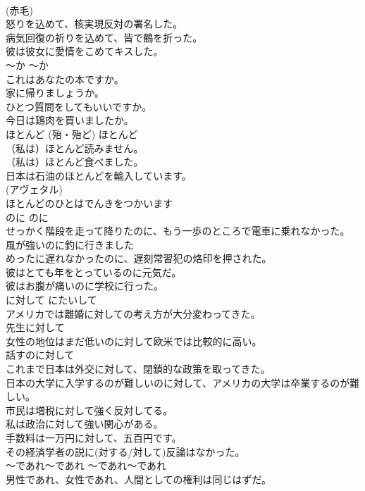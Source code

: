 \documentclass[8pt]{extreport}
\begin{document}
\begin{CJK}{UTF8}{min}
\\	(赤毛)
\\	怒りを込めて、核実現反対の署名した。  
\\	病気回復の祈りを込めて、皆で鶴を折った。  
\\	彼は彼女に愛情をこめてキスした。  
\\	〜か	〜か	
\\	これはあなたの本ですか。  
\\	家に帰りましょうか。  
\\	ひとつ質問をしてもいいですか。  
\\	今日は鶏肉を買いましたか。  
\\	ほとんど (殆・殆ど)	ほとんど	
\\	（私は）ほとんど読みません。  
\\	（私は）ほとんど食べました。  
\\	日本は石油のほとんどを輸入しています。  
\\	(アヴェタル)
\\	ほとんどのひとはでんきをつかいます  
\\	のに	のに	
\\	せっかく階段を走って降りたのに、もう一歩のところで電車に乗れなかった。  
\\	風が強いのに釣に行きました  
\\	めったに遅れなかったのに、遅刻常習犯の烙印を押された。  
\\	彼はとても年をとっているのに元気だ。   
\\	彼はお腹が痛いのに学校に行った。   
\\	に対して	にたいして	
\\	アメリカでは離婚に対しての考え方が大分変わってきた。  
\\	先生に対して  
\\	女性の地位はまだ低いのに対して欧米では比較的に高い。  
\\	話すのに対して  
\\	これまで日本は外交に対して、閉鎖的な政策を取ってきた。   
\\	日本の大学に入学するのが難しいのに対して、アメリカの大学は卒業するのが難しい。   
\\	市民は増税に対して強く反対してる。   
\\	私は政治に対して強い関心がある。   
\\	手数料は一万円に対して、五百円です。  
\\	その経済学者の説に(対する/対して)反論はなかった。  
\\	〜であれ〜であれ	〜であれ〜であれ	
\\	男性であれ、女性であれ、人間としての権利は同じはずだ。  

\end{CJK}
\end{document}
